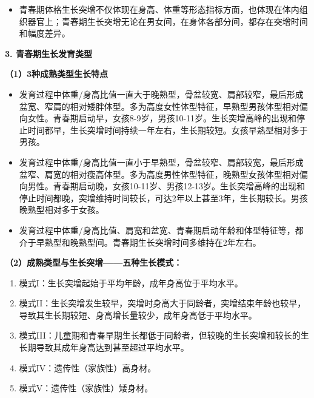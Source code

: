 \begin{keybox}
\vspace{3pt}
\begin{center}
\end{center}
\vspace{3pt}

\begin{itemize}[leftmargin=*]
    \item 青春期体格生长突增不仅体现在身高、体重等形态指标方面，也体现在体内组织器官上；青春期生长突增无论在男女间，在身体各部分间，都存在突增时间和幅度差异。
\end{itemize}

\textbf{3. 青春期生长发育类型}

\textbf{（1）3种成熟类型生长特点}
\begin{itemize}[leftmargin=*]
    \item {}发育过程中体重/身高比值一直大于晚熟型，骨盆较宽、肩部较窄，最后形成盆宽、窄肩的相对矮胖体型。多为高度女性体型特征，早熟型男孩体型相对偏向女性。青春期启动早，女孩8-9岁，男孩10-11岁。生长突增高峰的出现和停止时间都早，生长突增时间持续一年左右，生长期较短。女孩早熟型相对多于男孩。
    \item {}发育过程中体重/身高比值一直小于早熟型，骨盆较窄、肩部较宽，最后形成盆窄、肩宽的相对瘦高体型。多为高度男性体型特征，晚熟型女孩体型相对偏向男性。青春期启动晚，女孩10-11岁、男孩12-13岁。生长突增高峰的出现和停止时间都晚，突增维持时间较长，可达2年以上甚至3年，生长期较长。男孩晚熟型相对多于女孩。
    \item {}发育过程中体重/身高比值、肩宽和盆宽、青春期启动年龄和体型特征等，都介于早熟型和晚熟型间。青春期生长突增时间多维持在2年左右。
\end{itemize}

\textbf{（2）成熟类型与生长突增——五种生长模式：}
\begin{enumerate}[leftmargin=*]
    \item 模式I：生长突增起始于平均年龄，成年身高位于平均水平。
    \item 模式II：生长突增发生较早，突增时身高大于同龄者，突增结束年龄也较早，导致其生长期较短、身高增长量较少，成年身高低于平均水平。
    \item 模式III：儿童期和青春早期生长都低于同龄者，但较晚的生长突增和较长的生长期导致其成年身高达到甚至超过平均水平。
    \item 模式IV：遗传性（家族性）高身材。
    \item 模式V：遗传性（家族性）矮身材。
\end{enumerate}

\vspace{3pt}
\begin{center}
\end{center}
\vspace{3pt}
\end{keybox}

